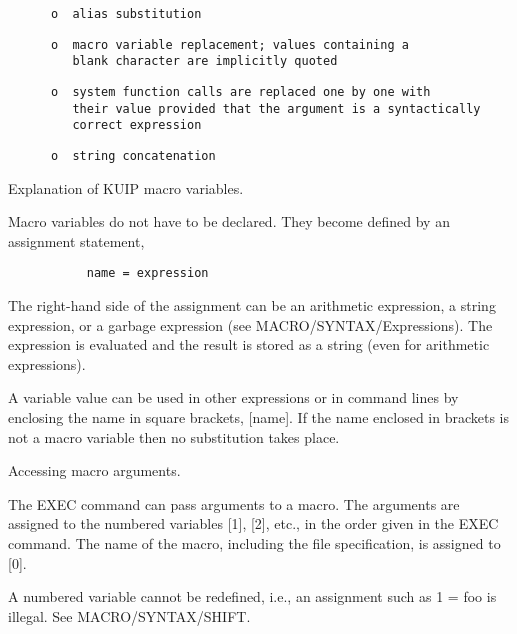 \begin{verbatim}
      o  alias substitution
\end{verbatim}
\begin{verbatim}
      o  macro variable replacement; values containing a
         blank character are implicitly quoted
\end{verbatim}
\begin{verbatim}
      o  system function calls are replaced one by one with
         their value provided that the argument is a syntactically
         correct expression
\end{verbatim}
\begin{verbatim}
      o  string concatenation
\end{verbatim}

\ENDCMD
{}
\ifMENUtext
   \par
Explanation of KUIP macro variables.  

   \par
Macro variables do not have to be declared. They become defined by an 
   assignment statement, 

\begin{verbatim}
           name = expression
\end{verbatim}
\ENDVERB
   \par
The right-hand side of the assignment can be an arithmetic expression, a 
   string expression, or a garbage expression (see MACRO/SYNTAX/Expressions). 
   The expression is evaluated and the result is stored as a string (even for 
   arithmetic expressions).  

   \par
A variable value can be used in other expressions or in command lines by 
   enclosing the name in square brackets, [name]. If the name enclosed in 
   brackets is not a macro variable then no substitution takes place.  


\fi


   \par
Accessing macro arguments.  

   \par
The EXEC command can pass arguments to a macro. The arguments are assigned 
   to the numbered variables [1], [2], etc., in the order given in the EXEC 
   command.  The name of the macro, including the file specification, is 
   assigned to [0].  

   \par
A numbered variable cannot be redefined, i.e., an assignment such as 
   \DQUOTE{}1 = foo\DQUOTE{} is illegal.  See MACRO/SYNTAX/SHIFT.  

